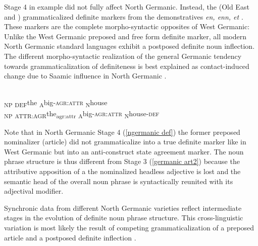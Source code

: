 {Stage 4 in example  did not fully affect North Germanic. Instead, the  (Old East and ) grammaticalized definite markers from the demonstratives \textit{en, enn, et} \citep[15]{heinrichs1954}. These markers are the complete morpho-syntactic opposites of West Germanic: Unlike the West Germanic preposed and free form definite marker, all modern North Germanic standard languages exhibit a postposed definite noun inflection. The different morpho-syntactic realization of the general Germanic tendency towards grammaticalization of definiteness is best explained as contact-induced change due to Saamic influence in North Germanic \citep{kusmenko2008}.
\begin{exe}
\label{germanic gram3}
\begin{xlist}
\begin{xlist}
\\
{\ob}\textsubscript{\upshape NP} \textsubscript{\upshape DEF}the \textsubscript{\upshape A}big{\rm -\textsc{agr:attr}} \textsubscript{\upshape N}house{\cb}
\\
\label{ngermanic def}
{\ob}\textsubscript{\upshape NP} \textsubscript{\upshape ATTR:AGR}the\textsubscript{\upshape agr:attr} \textsubscript{\upshape A}big{\rm -\textsc{agr:attr}} \textsubscript{\upshape N}house{\rm -\textsc{def}}{\cb}
\end{xlist}
\end{xlist}
\end{exe}

Note that in North Germanic Stage 4 (\ref{ngermanic def}) the former preposed nominalizer (article) did not grammaticalize into a true definite marker like in West Germanic but into an anti\hyp{}construct state agreement marker. The noun phrase structure is thus different from Stage 3 (\ref{germanic art2}) because the attributive apposition of a the nominalized headless adjective is lost and the semantic head of the overall noun phrase is syntactically reunited with its adjectival modifier.

Synchronic data from different North Germanic varieties reflect intermediate stages in the evolution of definite noun phrase structure. This cross-linguistic variation is most likely the result of competing grammaticalization of a preposed article and a postposed definite inflection \citep{dahl2003}. 

}
